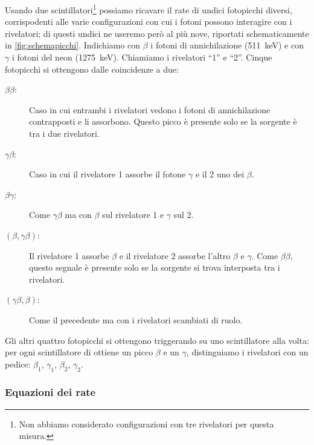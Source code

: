 Usando due scintillatori\footnote{Non abbiamo considerato configurazioni con tre rivelatori per questa misura.} possiamo ricavare il rate di undici fotopicchi diversi,
corrispodenti alle varie configurazioni con cui i fotoni possono interagire con i rivelatori;
di questi undici ne useremo però al più nove,
riportati schematicamente in \autoref{fig:schemapicchi}.
Indichiamo con $\beta$ i fotoni di annichilazione (\SI{511}{keV})
e con $\gamma$ i fotoni del neon (\SI{1275}{keV}).
Chiamiamo i rivelatori ``1'' e ``2''.
Cinque fotopicchi si ottengono dalle coincidenze a due:
\begin{description}
	\item[$\beta\beta$:]
	Caso in cui entrambi i rivelatori vedono i fotoni di annichilazione contrapposti e li assorbono.
	Questo picco è presente solo se la sorgente è tra i due rivelatori.
	\item[$\gamma\beta$:]
	Caso in cui il rivelatore 1 assorbe il fotone $\gamma$ e il 2 uno dei $\beta$.
	\item[$\beta\gamma$:]
	Come $\gamma\beta$ ma con $\beta$ sul rivelatore 1 e $\gamma$ sul 2.
	\item[$(\beta,\gamma\beta)$:]
	Il rivelatore 1 assorbe $\beta$ e il rivelatore 2 assorbe l'altro $\beta$ e $\gamma$.
	Come $\beta\beta$, questo segnale è presente solo se la sorgente si trova interposta tra i rivelatori.
	\item[$(\gamma\beta,\beta)$:]
	Come il precedente ma con i rivelatori scambiati di ruolo.
\end{description}
Gli altri quattro fotopicchi si ottengono triggerando su uno scintillatore alla volta:
per ogni scintillatore di ottiene un picco $\beta$ e un $\gamma$,
distinguiamo i rivelatori con un pedice: $\beta_1$, $\gamma_1$, $\beta_2$, $\gamma_2$.

\subsubsection{Equazioni dei rate}
\label{sec:eqrate}

